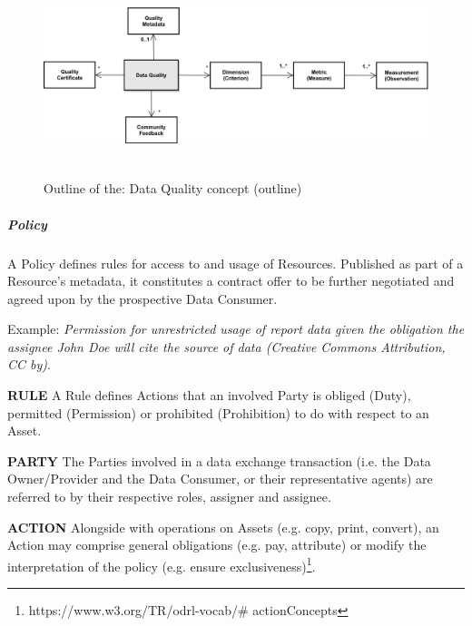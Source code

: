 
\begin{figure}[H]
	\begin{Center}
		\includegraphics[width=6.53in,height=2.31in]{./media/image45.png}
		\caption{Outline of the: Data Quality concept (outline)}
		\label{fig:Outline_of_the_Data_Quality_concept_outline}
	\end{Center}
\end{figure}






\subparagraph*{Policy}
A Policy defines rules for access to and usage of Resources. Published as part of a Resource’s metadata, it constitutes a contract offer to be further negotiated and agreed upon by the prospective Data Consumer. 

Example: \textit{Permission for unrestricted usage of report data given the obligation the assignee John Doe will cite the source of data (Creative Commons Attribution, CC by)}.

\textbf{RULE} A Rule defines Actions that an involved Party is obliged (Duty), permitted (Permission) or prohibited (Prohibition) to do with respect to an Asset.

\textbf{PARTY }The Parties involved in a data exchange transaction (i.e. the Data Owner/Provider and the Data Consumer, or their representative agents) are referred to by their respective roles, assigner and assignee. 

\textbf{ACTION} Alongside with operations on Assets (e.g. copy, print, convert), an Action may comprise general obligations (e.g. pay, attribute) or modify the interpretation of the policy (e.g. ensure exclusiveness)\footnote{https://www.w3.org/TR/odrl-vocab/$\#$ actionConcepts }. 

